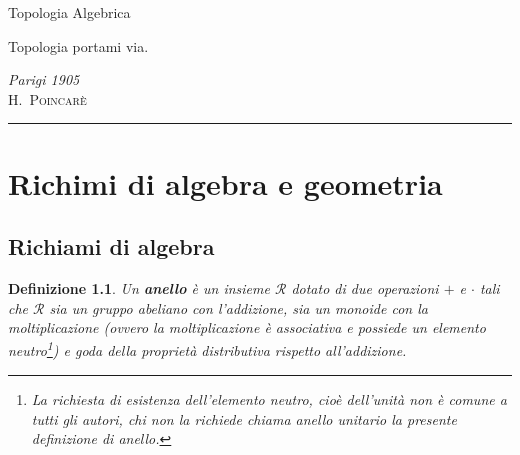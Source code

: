 \documentclass[10pt, twoside=false, x11names]{scrbook}
\newtheorem{definition}[theorem]{Definizione}
\newcommand{\R}{\mathcal{R}}
\begin{document}
\begin{titlepage}

  \noindent
  \titlefont Topologia Algebrica
  \epigraph{Topologia portami via.}%
  {\textit{Parigi 1905}\\ \textsc{H.\ Poincarè}}
  \null\vfill
  \vspace*{1cm}
  \noindent
  \hfill
  \begin{minipage}{0.35\linewidth}
    \begin{flushright}
      \printauthor
    \end{flushright}
  \end{minipage}
  \begin{minipage}{0.02\linewidth}
    \rule{1pt}{125pt}
  \end{minipage}
  \titlepagedecoration
\end{titlepage}

\tableofcontents
{}
\printsymblist


\chapter{Richimi di algebra e geometria}
\section{Richiami di algebra}

\newmathsymb{R}{\R}{Anello}
\begin{definition}
  Un \textbf{anello}  è un insieme $ \R $ dotato di due operazioni $ + $ e $ \cdot $ tali che
  $ \R $ sia un gruppo abeliano con l'addizione, sia un monoide con la moltiplicazione
  (ovvero la moltiplicazione è associativa e possiede un elemento neutro\footnote{La richiesta
    di esistenza dell'elemento neutro, cioè dell'unità non è comune a tutti gli autori,
    chi non la richiede chiama anello unitario  la presente
    definizione di anello.}) e goda della proprietà distributiva rispetto all'addizione.
\end{definition}
\end{document}
